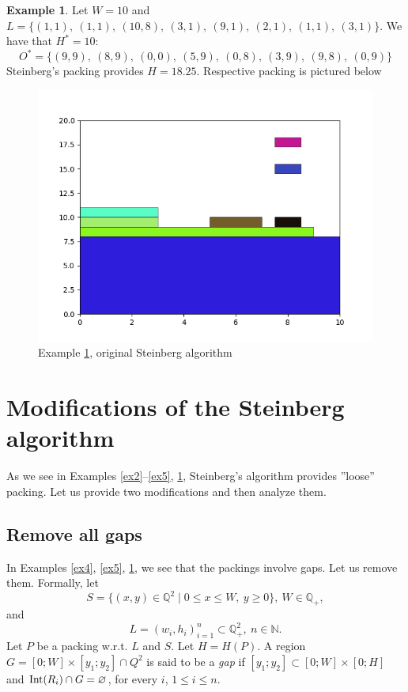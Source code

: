 \documentclass{article}
\theoremstyle{definition}
\newtheorem{example}{Example}
\theoremstyle{theorem}
\numberwithin{proposition}{section}
\begin{document}
    \begin{example}\label{ex7}
        Let $W = 10$ and $L = \{(1,1),~(1,1),~(10,8),~(3,1),~(9,1),~(2,1),~(1,1),~(3,1)\}$. We have that $H^{*} = 10$:
        \begin{equation*}
            O^{*}=\{(9,9),~(8,9),~(0,0),~(5,9),~(0,8),~(3,9),~(9,8),~(0,9)\}
        \end{equation*} 
        Steinberg’s packing provides $H = 18.25$. Respective packing is pictured below
        \begin{figure}[H]
            \centering
            \includegraphics[scale=0.5]{../examples/original-7.png}
            \caption{Example \ref{ex7}, original Steinberg algorithm}
        \end{figure} 
    \end{example}
\section*{Modifications of the Steinberg algorithm}
    As we see in Examples \ref{ex2}--\ref{ex5}, \ref{ex7}, Steinberg’s algorithm provides ”loose” packing. Let us provide two modifications and then analyze them.
    \subsection*{Remove all gaps}
        In Examples \ref{ex4}, \ref{ex5}, \ref{ex7}, we see that the packings involve gaps. Let us remove them. Formally, let 
        \begin{equation*}
            S=\{(x,y)\in\mathbb{Q}^2\mid 0\leq x\leq W,~y\geq0\},~W\in \mathbb{Q}_{+}, 
        \end{equation*}
        and 
        \begin{equation*}
            L={(w_i,h_i)}_{i=1}^{n} \subset \mathbb{Q}_{+}^2,~n\in\mathbb{N}.
        \end{equation*}
        Let $P$ be a packing w.r.t. $L$ and $S$. Let $H = H(P)$. A region $G = [0;W]\times[y_1;y_2]\cap Q^2$ is said to be a \textit{gap} if $[y_1;y_2] \subset [0;W]\times [0;H]$ and ${\rm Int}(R_i)\cap G = \varnothing$, for every $i$, $1 \leq i \leq n$.
\end{document}
